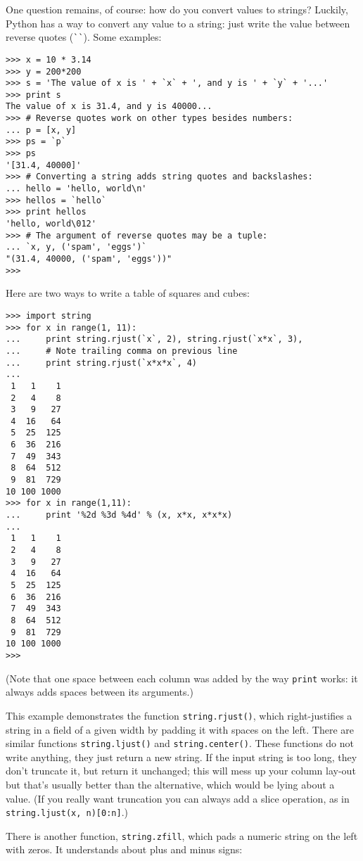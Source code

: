 One question remains, of course: how do you convert values to strings?
Luckily, Python has a way to convert any value to a string: just write
the value between reverse quotes (\verb/``/).  Some examples:

\bcode\begin{verbatim}
>>> x = 10 * 3.14
>>> y = 200*200
>>> s = 'The value of x is ' + `x` + ', and y is ' + `y` + '...'
>>> print s
The value of x is 31.4, and y is 40000...
>>> # Reverse quotes work on other types besides numbers:
... p = [x, y]
>>> ps = `p`
>>> ps
'[31.4, 40000]'
>>> # Converting a string adds string quotes and backslashes:
... hello = 'hello, world\n'
>>> hellos = `hello`
>>> print hellos
'hello, world\012'
>>> # The argument of reverse quotes may be a tuple:
... `x, y, ('spam', 'eggs')`
"(31.4, 40000, ('spam', 'eggs'))"
>>>
\end{verbatim}\ecode
%
Here are two ways to write a table of squares and cubes:

\bcode\begin{verbatim}
>>> import string
>>> for x in range(1, 11):
...     print string.rjust(`x`, 2), string.rjust(`x*x`, 3),
...     # Note trailing comma on previous line
...     print string.rjust(`x*x*x`, 4)
...
 1   1    1
 2   4    8
 3   9   27
 4  16   64
 5  25  125
 6  36  216
 7  49  343
 8  64  512
 9  81  729
10 100 1000
>>> for x in range(1,11):
...     print '%2d %3d %4d' % (x, x*x, x*x*x)
... 
 1   1    1
 2   4    8
 3   9   27
 4  16   64
 5  25  125
 6  36  216
 7  49  343
 8  64  512
 9  81  729
10 100 1000
>>>
\end{verbatim}\ecode
%
(Note that one space between each column was added by the way {\tt print}
works: it always adds spaces between its arguments.)

This example demonstrates the function {\tt string.rjust()}, which
right-justifies a string in a field of a given width by padding it with
spaces on the left.  There are similar functions {\tt string.ljust()}
and {\tt string.center()}.  These functions do not write anything, they
just return a new string.  If the input string is too long, they don't
truncate it, but return it unchanged; this will mess up your column
lay-out but that's usually better than the alternative, which would be
lying about a value.  (If you really want truncation you can always add
a slice operation, as in {\tt string.ljust(x,~n)[0:n]}.)

There is another function, {\tt string.zfill}, which pads a numeric
string on the left with zeros.  It understands about plus and minus
signs:

